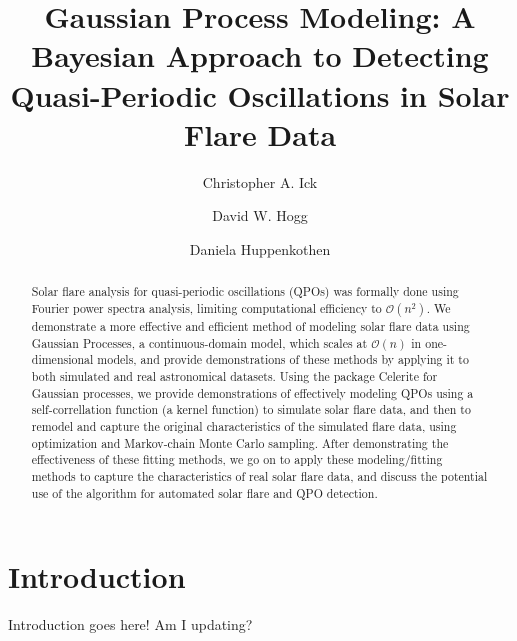 \documentclass{aastex61}
\begin{document}
\title{Gaussian Process Modeling: A Bayesian Approach to Detecting Quasi-Periodic Oscillations in Solar Flare Data} \label{sec:title and authors}

\author{Christopher A. Ick}

\author{David W. Hogg}

\author{Daniela Huppenkothen}

\begin{abstract} \label{sec:abstract} 
	Solar flare analysis for quasi-periodic oscillations (QPOs)  was formally done using Fourier power spectra analysis, limiting computational efficiency to $\mathcal{O}(n^2)$.
We demonstrate a more effective and efficient method of modeling solar flare data using Gaussian Processes, a continuous-domain model, which scales at $\mathcal{O}(n)$ in one-dimensional models, and provide demonstrations of these methods by applying it to both simulated and real astronomical datasets.
Using the package Celerite for Gaussian processes, we provide demonstrations of effectively modeling QPOs using a self-correllation function (a kernel function) to simulate solar flare data, and then to remodel and capture the original characteristics of the simulated flare data, using optimization and Markov-chain Monte Carlo sampling.
After demonstrating the effectiveness of these fitting methods, we go on to apply these modeling/fitting methods to capture the characteristics of real solar flare data, and discuss the potential use of the algorithm for automated solar flare and QPO detection.
\end{abstract}


\section{Introduction} \label{sec:intro}
Introduction goes here! Am I updating?
\end{document}
